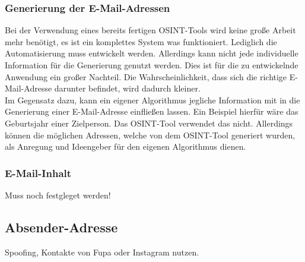 	\subsubsection{Generierung der E-Mail-Adressen}
	Bei der Verwendung eines bereits fertigen OSINT-Tools wird keine große Arbeit mehr benötigt, es ist ein komplettes System was funktioniert. Lediglich die Automatisierung muss entwickelt werden. Allerdings kann nicht jede individuelle Information für die Generierung genutzt werden. Dies ist für die zu entwickelnde Anwendung ein großer Nachteil. Die Wahrscheinlichkeit, dass sich die richtige E-Mail-Adresse darunter befindet, wird dadurch kleiner.\\
	Im Gegensatz dazu, kann ein eigener Algorithmus jegliche Information mit in die Generierung einer E-Mail-Adresse einfließen lassen. Ein Beispiel hierfür wäre das Geburtsjahr einer Zielperson. Das OSINT-Tool \cite{EmailAssumptions} verwendet das nicht. Allerdings können die möglichen Adressen, welche von dem OSINT-Tool generiert wurden, als Anregung und Ideengeber für den eigenen Algorithmus dienen.
	\subsubsection{E-Mail-Inhalt}
	Muss noch festgleget werden!
	\subsection{Absender-Adresse}
	Spoofing, Kontakte von Fupa oder Instagram nutzen.